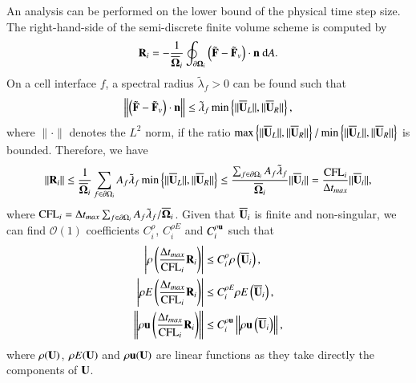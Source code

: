 An analysis can be performed on the lower bound of the physical time step size.
The right-hand-side of the semi-discrete finite volume scheme is computed by
\begin{equation}
    \label{eq:Semi-FV-1}
    \mathbf{R}_i = -\frac{1}{\overline{\mathbf{\Omega}}_i} \oint_{\partial \mathbf{\Omega}_i} \left(\tilde{\mathbf{F}} - \tilde{\mathbf{F}}_v \right) \cdot \mathbf{n} \ \dd A.
\end{equation}
On a cell interface $f$, a spectral radius $\tilde{\lambda}_f>0$ can be found such that
\begin{equation}
    \left\| \left(\tilde{\mathbf{F}} - \tilde{\mathbf{F}}_v \right) \cdot \mathbf{n} \right\| \leq \tilde{\lambda}_f \min \left\{\|\overline{\mathbf{U}}_L\|, \|\overline{\mathbf{U}}_R\| \right\},
\end{equation}
where $\|\cdot\|$ denotes the $L^2$ norm, if the ratio $\max \left\{\|\overline{\mathbf{U}}_L\|, \|\overline{\mathbf{U}}_R\| \right\}/\min \left\{\|\overline{\mathbf{U}}_L\|, \|\overline{\mathbf{U}}_R\| \right\}$ is bounded.
Therefore, we have
\begin{equation}
    \left\| \mathbf{R}_i \right\| 
    \leq \frac{1}{\overline{\mathbf{\Omega}}_i} \sum_{f \in \partial \Omega_i}{
        A_{f} \tilde{\lambda}_{f} \min \left\{\|\overline{\mathbf{U}}_L\|, \|\overline{\mathbf{U}}_R\| \right\}
    } 
    \leq \frac{\sum_{f \in \partial \Omega_i} A_f\tilde{\lambda}_f}{\overline{\mathbf{\Omega}}_i}\|\overline{\mathbf{U}}_i\|
    =
    \frac{\text{CFL}_i}{\mathrm\Delta t_{max}}\|\overline{\mathbf{U}}_i\|,
\end{equation}
where $\text{CFL}_i= \mathrm\Delta t_{max}\sum_{f \in \partial \Omega_i} A_f \tilde{\lambda}_f/\overline{\mathbf{\Omega}}_i$. 
Given that $\overline{\mathbf{U}}_i$ is finite and non-singular, we can find $\mathcal{O}(1)$ coefficients $C^{\rho}_i$, $C^{\rho E}_i$ and $C^{\rho \mathbf{u}}_i$ such that
\begin{equation}
    \begin{aligned}
        \left| \rho\left( \frac{\mathrm\Delta t_{max}}{\text{CFL}_i} \mathbf{R}_i \right) \right|
        & \leq
        C^\rho_i \rho\left( \overline{\mathbf{U}}_i \right),\\
        \left| \rho E\left( \frac{\mathrm\Delta t_{max}}{\text{CFL}_i} \mathbf{R}_i \right) \right|
        & \leq
        C^{\rho E}_i \rho E\left( \overline{\mathbf{U}}_i \right),\\
        \left\| \rho \mathbf{u}\left( \frac{\mathrm\Delta t_{max}}{\text{CFL}_i} \mathbf{R}_i \right) \right\|
        & \leq
        C^{\rho \mathbf{u}}_i \left\| \rho \mathbf{u}\left( \overline{\mathbf{U}}_i \right)              \right\|,\\
    \end{aligned}
\end{equation}
where $\rho(\mathbf{U})$, $\rho E(\mathbf{U})$ and $\rho \mathbf{u}(\mathbf{U})$ are linear functions as they take directly the components of $\mathbf{U}$.

